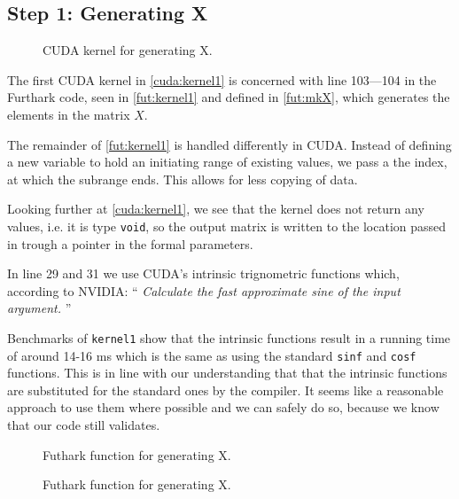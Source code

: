 \subsection{
    Step 1: Generating X
}

\begin{figure}[H]
    \centering
    \caption{CUDA kernel for generating X.}
    \label{cuda:kernel1}
\end{figure}



The first CUDA kernel in \autoref{cuda:kernel1} is concerned with line 103---104
in the Furthark code, seen in \autoref{fut:kernel1} and defined in \autoref{fut:mkX},
which generates the elements in the matrix \(X\).

The remainder of \autoref{fut:kernel1} is handled differently in CUDA. Instead of
defining a new variable to hold an initiating range of existing values, we pass a
the index, at which the subrange ends. This allows for less copying of data.

Looking further at \autoref{cuda:kernel1}, we see that the kernel does not
return any values, i.e. it is type \texttt{void}, so the output matrix is
written to the location passed in trough a pointer in the formal parameters.


In line 29 and 31 we use CUDA's intrinsic trignometric functions which,
according to NVIDIA:
\enquote{
    \textit{
Calculate the fast approximate sine of the input argument.
}
}

Benchmarks of \texttt{kernel1} show that the intrinsic functions result in a
running time of around 14-16 ms which is the same as using the standard
\texttt{sinf} and \texttt{cosf} functions. This is in line with our
understanding that that the intrinsic functions are substituted for the standard
ones by the compiler. It seems like a reasonable approach to use them where
possible and we can safely do so, because we know that our code still validates.

\begin{figure}[H]
    \centering
    \caption{Futhark function for generating X.}
    \label{fut:kernel1}
\end{figure}


\begin{figure}[H]
    \centering
    \caption{Futhark function for generating X.}
    \label{fut:mkX}
\end{figure}



